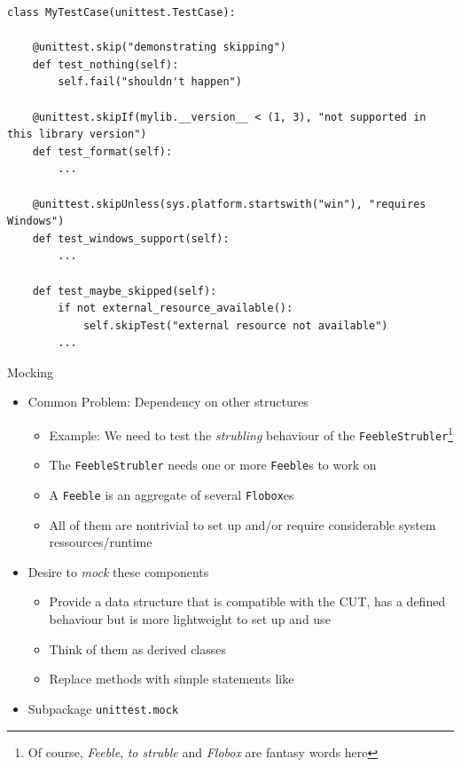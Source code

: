 
\begin{frame}[fragile]
%
\begin{codebox}[skipTests.py]
\begin{verbatim}
class MyTestCase(unittest.TestCase):

    @unittest.skip("demonstrating skipping")
    def test_nothing(self):
        self.fail("shouldn't happen")

    @unittest.skipIf(mylib.__version__ < (1, 3), "not supported in this library version")
    def test_format(self):
        ...

    @unittest.skipUnless(sys.platform.startswith("win"), "requires Windows")
    def test_windows_support(self):
        ...

    def test_maybe_skipped(self):
        if not external_resource_available():
            self.skipTest("external resource not available")
        ...
\end{verbatim}
\end{codebox}
%
\end{frame}


\begin{frame}{Mocking}
%
\begin{itemize}
\item Common Problem: Dependency on other structures
	\begin{itemize}
	\item Example: We need to test the \emph{strubling} behaviour of the \texttt{FeebleStrubler}\footnote%
		{Of course, \emph{Feeble}, \emph{to struble} and \emph{Flobox} are fantasy words here}
	\item The \texttt{FeebleStrubler} needs one or more \texttt{Feeble}s to work on
	\item A \texttt{Feeble} is an aggregate of several \texttt{Flobox}es
	\item All of them are nontrivial to set up and/or require considerable system ressources/runtime
	\end{itemize}
\pause
\item[\Thus] Desire to \emph{mock} these components
	\begin{itemize}
	\item Provide a data structure that is compatible with the CUT, has a defined behaviour but is more lightweight to set up and use
	\item Think of them as derived classes
	\item Replace methods with simple statements like 
	\end{itemize}
\item[\Thus] Subpackage \texttt{unittest.mock}
\end{itemize}
%
\end{frame}

